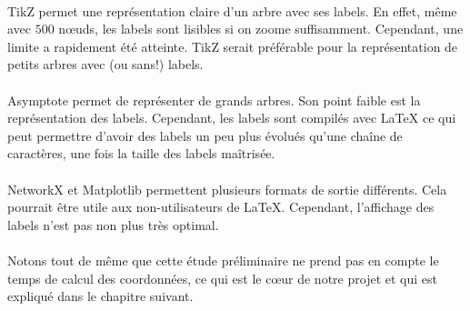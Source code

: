 \paragraph{}TikZ permet une représentation claire d'un arbre avec ses labels. En effet, même avec $500$ n\oe uds, les labels sont lisibles si on zoome suffisamment. Cependant, une limite a rapidement été atteinte. TikZ serait préférable pour la représentation de petits arbres avec (ou sans!) labels.
\paragraph{}Asymptote permet de représenter de grands arbres. Son point faible est la représentation des labels. Cependant, les labels sont compilés avec \LaTeX{} ce qui peut permettre d'avoir des labels un peu plus évolués qu'une chaîne de caractères, une fois la taille des labels maîtrisée.
\paragraph{}NetworkX et Matplotlib permettent plusieurs formats de sortie différents. Cela pourrait être utile aux non-utilisateurs de \LaTeX{}. Cependant, l'affichage des labels n'est pas non plus très optimal.
\paragraph{}Notons tout de même que cette étude préliminaire ne prend pas en compte le temps de calcul des coordonnées, ce qui est le c\oe ur de notre projet et qui est expliqué dans le chapitre suivant.
